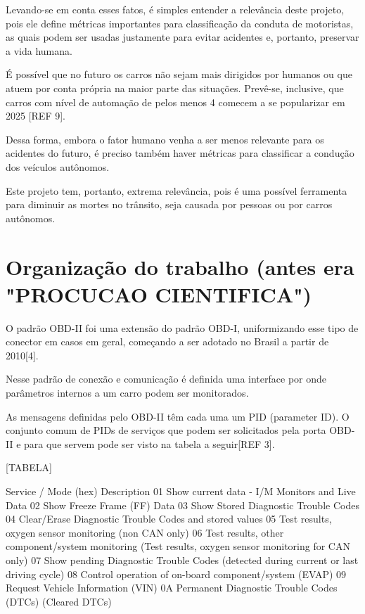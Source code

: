 Levando-se em conta esses fatos, é simples entender a relevância deste projeto, pois ele define métricas importantes para classificação da conduta de motoristas, as quais podem ser usadas justamente para evitar acidentes e, portanto, preservar a vida humana.

É possível que no futuro os carros não sejam mais dirigidos por humanos ou que atuem por conta própria na maior parte das situações. Prevê-se, inclusive, que carros com nível de automação de pelos menos 4 comecem a se popularizar em 2025 [REF 9].

Dessa forma, embora o fator humano venha a ser menos relevante para os acidentes do futuro, é preciso também haver métricas para classificar a condução dos veículos autônomos.

Este projeto tem, portanto, extrema relevância, pois é uma possível ferramenta para diminuir as mortes no trânsito, seja causada por pessoas ou por carros autônomos.

\section{Organização do trabalho (antes era "PROCUCAO CIENTIFICA")}

O padrão OBD-II foi uma extensão do padrão OBD-I, uniformizando esse tipo de conector em casos em geral, começando a ser adotado no Brasil a partir de 2010[4].

Nesse padrão de conexão e comunicação é definida uma interface por onde parâmetros internos a um carro podem ser monitorados.

As mensagens definidas pelo OBD-II têm cada uma um PID (parameter ID). O conjunto comum de PIDs de serviços que podem ser solicitados pela porta OBD-II e para que servem pode ser visto na tabela a seguir[REF 3].

[TABELA]

Service / Mode (hex)
Description
01
Show current data - I/M Monitors and Live Data
02
Show Freeze Frame (FF) Data
03
Show Stored Diagnostic Trouble Codes
04
Clear/Erase Diagnostic Trouble Codes and stored values
05
Test results, oxygen sensor monitoring (non CAN only)
06
Test results, other component/system monitoring (Test results, oxygen sensor monitoring for CAN only)
07
Show pending Diagnostic Trouble Codes (detected during current or last driving cycle)
08
Control operation of on-board component/system (EVAP)
09
Request Vehicle Information (VIN)
0A
Permanent Diagnostic Trouble Codes (DTCs) (Cleared DTCs)

